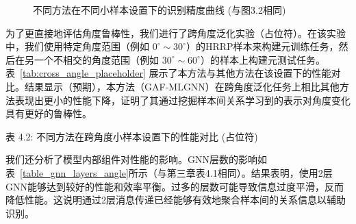 \begin{figure*}[!h]
\centering

\caption{不同方法在不同小样本设置下的识别精度曲线 (与图3.2相同)}
\label{Fig_10}
\end{figure*}

为了更直接地评估角度鲁棒性，我们进行了跨角度泛化实验（占位符）。在该实验中，我们使用特定角度范围（例如 $0^\circ \sim 30^\circ$）的HRRP样本来构建元训练任务，然后在另一个不相交的角度范围（例如 $30^\circ \sim 60^\circ$）的样本上构建元测试任务。表~\ref{tab:cross_angle_placeholder} 展示了本方法与其他方法在该设置下的性能对比。结果显示（预期），本方法（GAF-MLGNN）在跨角度泛化任务上相比其他方法表现出更小的性能下降，证明了其通过挖掘样本间关系学习到的表示对角度变化具有更好的鲁棒性。

\begin{table}[h!]
    \centering
    \captionsetup{labelformat=empty, textformat=empty} %
    \caption*{表 4.2: 不同方法在跨角度小样本设置下的性能对比 (占位符)}
    \label{tab:cross_angle_placeholder}
\end{table}

我们还分析了模型内部组件对性能的影响。GNN层数的影响如表~\ref{table_gnn_layers_angle}所示（与第三章表4.1相同）。结果表明，使用2层GNN能够达到较好的性能和效率平衡。过多的层数可能导致信息过度平滑，反而降低性能。这说明通过2层消息传递已经能够有效地聚合样本间的关系信息以辅助识别。

